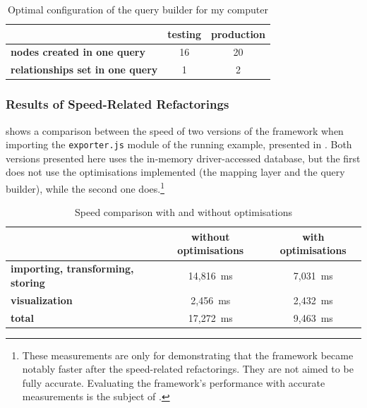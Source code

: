 \begin{table}[!htb]
	\centering
	\begin{tabular}{l|cc}
		\toprule
																								&   \textbf{testing}   &   \textbf{production}   \\
		\midrule
		\textbf{nodes created in one query}         &   16                 &   20                    \\
		\textbf{relationships set in one query}     &   1                  &   2                     \\
		\bottomrule
	\end{tabular}

	\caption{Optimal configuration of the query builder for my computer}
	\label{table:query-builder-config}
\end{table}


\subsubsection{Results of Speed-Related Refactorings}

 shows a comparison between the speed of two versions of the framework when importing the \lstinline{exporter.js} module of the running example, presented in . Both versions presented here uses the in-memory driver-accessed database, but the first does not use the optimisations implemented (the mapping layer and the query builder), while the second one does.\footnote{These measurements are only for demonstrating that the framework became notably faster after the speed-related refactorings. They are not aimed to be fully accurate. Evaluating the framework's performance with accurate measurements is the subject of .}

\begin{table}[!htb]
	\centering
	\begin{tabular}{l|cc}
		\toprule
																								&   \textbf{without optimisations}     &   \textbf{with optimisations}   \\
		\midrule
		\textbf{importing, transforming, storing}   &   14,816~ms                          &   7,031~ms                      \\
		\textbf{visualization}                      &   2,456~ms                           &   2,432~ms                      \\
		\midrule
		\textbf{total}                              &   17,272~ms                          &   9,463~ms                      \\
		\bottomrule
	\end{tabular}

	\caption{Speed comparison with and without optimisations}
	\label{table:results-of-query-optimisations}
\end{table}


